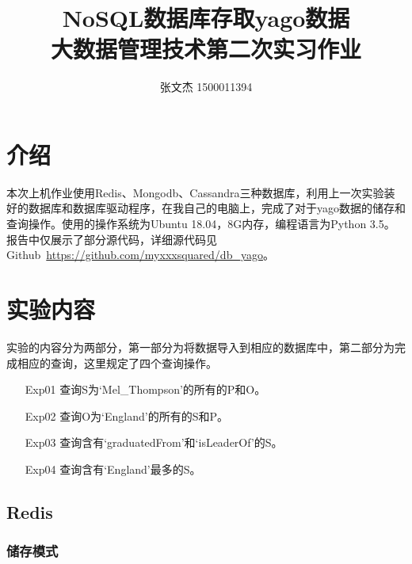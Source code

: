\documentclass[12pt]{ctexart}
\title{NoSQL数据库存取yago数据\\{\Large 大数据管理技术第二次实习作业}}
\author{张文杰 1500011394}
\begin{document}
\maketitle

\section{介绍}
本次上机作业使用Redis、Mongodb、Cassandra三种数据库，利用上一次实验装好的数据库和数据库驱动程序，在我自己的电脑上，完成了对于yago数据的储存和查询操作。使用的操作系统为Ubuntu 18.04，8G内存，编程语言为Python 3.5。报告中仅展示了部分源代码，详细源代码见Github~\url{https://github.com/myxxxsquared/db_yago}。

\section{实验内容}

实验的内容分为两部分，第一部分为将数据导入到相应的数据库中，第二部分为完成相应的查询，这里规定了四个查询操作。
\begin{enumerate}
    \itemsep0em
    \item[Exp01] 查询S为`Mel\_Thompson'的所有的P和O。
    \item[Exp02] 查询O为`England'的所有的S和P。
    \item[Exp03] 查询含有`graduatedFrom'和`isLeaderOf'的S。
    \item[Exp04] 查询含有`England'最多的S。
\end{enumerate}

\subsection{Redis}

\subsubsection{储存模式}
\end{document}
